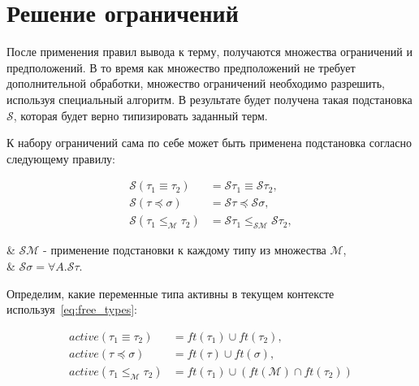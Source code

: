 \section{Решение ограничений}
\label{sec:constraint_solving}

После применения правил вывода к терму, получаются множества ограничений и предположений.
В то время как множество предположений не требует дополнительной обработки, множество ограничений необходимо разрешить, используя специальный алгоритм.
В результате будет получена такая подстановка $\mathcal{S}$, которая будет верно типизировать заданный терм.

К набору ограничений сама по себе может быть применена подстановка согласно следующему правилу:

\begin{equation}
    \label{eq:consts_subst}
    \begin{aligned}
        \mathcal{S} (\tau_1 \equiv \tau_2)             &= \mathcal{S} \tau_1 \equiv \mathcal{S} \tau_2, \\
        \mathcal{S} (\tau \preceq \sigma)              &= \mathcal{S} \tau \preceq \mathcal{S} \sigma,  \\
        \mathcal{S} (\tau_1 \leq_{\mathcal{M}} \tau_2) &= \mathcal{S} \tau_1 \leq_{\mathcal{S} \mathcal{M}} \mathcal{S} \tau_2,
    \end{aligned}
\end{equation}
\begin{eqrem}
    & $\mathcal{S} \mathcal{M}$ - применение подстановки к каждому типу из множества $\mathcal{M}$, \\
    & $\mathcal{S} \sigma = \forall A. \mathcal{S} \tau$.                                           \\
\end{eqrem}

Определим, какие переменные типа активны в текущем контексте используя~\ref{eq:free_types}:

\begin{equation}
    \label{eq:active_vars}
    \begin{aligned}
        active(\tau_1 \equiv \tau_2) &= ft(\tau_1) \cup ft(\tau_2), \\
        active(\tau \preceq \sigma) &= ft(\tau) \cup ft(\sigma), \\
        active(\tau_1 \leq_{\mathcal{M}} \tau_2) &= ft(\tau_1) \cup (ft(\mathcal{M}) \cap ft(\tau_2))
    \end{aligned}
\end{equation}

